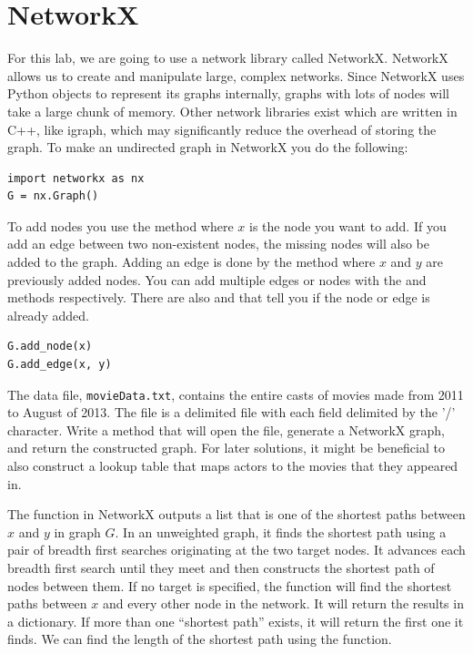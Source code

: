 \section*{NetworkX}
For this lab, we are going to use a network library called NetworkX. NetworkX allows us to create and manipulate large, complex networks.  Since NetworkX uses Python objects to represent its graphs internally, graphs with lots of nodes will take a large chunk of memory.  Other network libraries exist which are written in C++, like igraph, which may significantly reduce the overhead of storing the graph.
To make an undirected graph in NetworkX you do the following:
\begin{lstlisting}
import networkx as nx
G = nx.Graph()
\end{lstlisting}
To add nodes you use the  method where $x$ is the node you want to add.  If you add an edge between two non-existent nodes, the missing nodes will also be added to the graph. Adding an edge is done by the  method where $x$ and $y$ are previously added nodes. You can add multiple edges or nodes with the  and  methods respectively.  There are also  and  that tell you if the node or edge is already added.
\begin{lstlisting}
G.add_node(x)
G.add_edge(x, y)
\end{lstlisting}

\begin{problem}
The data file, \texttt{movieData.txt}, contains the entire casts of movies made from 2011 to August of 2013. The file is a delimited file with each field delimited by the '/' character.
Write a method that will open the file, generate a NetworkX graph, and return the constructed graph.
For later solutions, it might be beneficial to also construct a lookup table that maps actors to the movies that they appeared in.
\end{problem}

The  function in NetworkX outputs a list that is one of the shortest paths between $x$ and $y$ in graph $G$.  In an unweighted graph, it finds the shortest path using a pair of breadth first searches originating at the two target nodes.  It advances each breadth first search until they meet and then  constructs the shortest path of nodes between them.  If no target is specified, the function will find the shortest paths between $x$ and every other node in the network.  It will return the results in a dictionary.  If more than one ``shortest path'' exists, it will return the first one it finds.  We can find the length of the shortest path using the  function.

